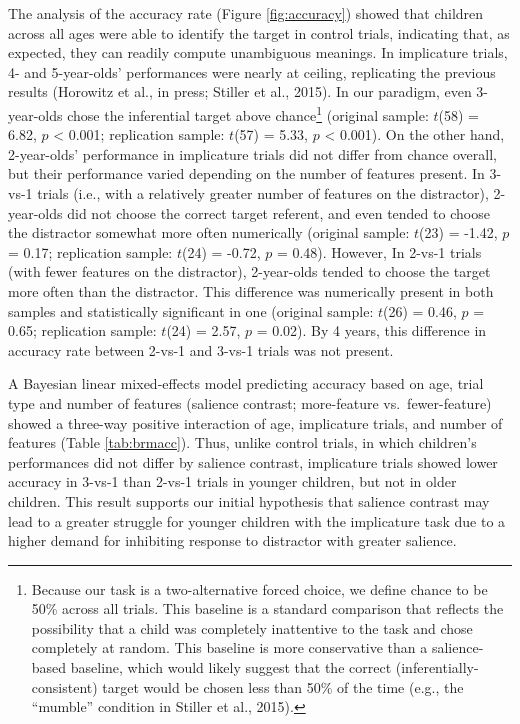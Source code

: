 \documentclass[mask,man]{apa6}
\theoremstyle{definition}
\theoremstyle{definition}
\theoremstyle{definition}
\theoremstyle{remark}
\begin{document}
The analysis of the accuracy rate (Figure \ref{fig:accuracy}) showed
that children across all ages were able to identify the target in
control trials, indicating that, as expected, they can readily compute
unambiguous meanings. In implicature trials, 4- and 5-year-olds'
performances were nearly at ceiling, replicating the previous results
(Horowitz et al., in press; Stiller et al., 2015). In our paradigm, even
3-year-olds chose the inferential target above chance\footnote{Because
  our task is a two-alternative forced choice, we define chance to be
  50\% across all trials. This baseline is a standard comparison that
  reflects the possibility that a child was completely inattentive to
  the task and chose completely at random. This baseline is more
  conservative than a salience-based baseline, which would likely
  suggest that the correct (inferentially-consistent) target would be
  chosen less than 50\% of the time (e.g., the \enquote{mumble}
  condition in Stiller et al., 2015).} (original sample: \(t\)(58) =
6.82, \(p\) \textless{} 0.001; replication sample: \(t\)(57) = 5.33,
\(p\) \textless{} 0.001). On the other hand, 2-year-olds' performance in
implicature trials did not differ from chance overall, but their
performance varied depending on the number of features present. In
3-vs-1 trials (i.e., with a relatively greater number of features on the
distractor), 2-year-olds did not choose the correct target referent, and
even tended to choose the distractor somewhat more often numerically
(original sample: \(t\)(23) = -1.42, \(p\) = 0.17; replication sample:
\(t\)(24) = -0.72, \(p\) = 0.48). However, In 2-vs-1 trials (with fewer
features on the distractor), 2-year-olds tended to choose the target
more often than the distractor. This difference was numerically present
in both samples and statistically significant in one (original sample:
\(t\)(26) = 0.46, \(p\) = 0.65; replication sample: \(t\)(24) = 2.57,
\(p\) = 0.02). By 4 years, this difference in accuracy rate between
2-vs-1 and 3-vs-1 trials was not present.

A Bayesian linear mixed-effects model predicting accuracy based on age,
trial type and number of features (salience contrast; more-feature
vs.~fewer-feature) showed a three-way positive interaction of age,
implicature trials, and number of features (Table \ref{tab:brmacc}).
Thus, unlike control trials, in which children's performances did not
differ by salience contrast, implicature trials showed lower accuracy in
3-vs-1 than 2-vs-1 trials in younger children, but not in older
children. This result supports our initial hypothesis that salience
contrast may lead to a greater struggle for younger children with the
implicature task due to a higher demand for inhibiting response to
distractor with greater salience.
\end{document}
